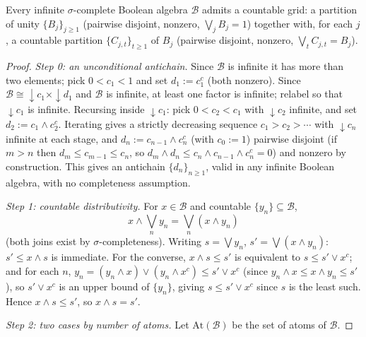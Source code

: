 \documentclass[10pt,a4paper]{amsart}
\begin{document}
\begin{theorem}\label{thm:grid-existence}
Every infinite $\sigma$-complete Boolean algebra $\mathcal B$ admits a
countable grid: a partition of unity $\{B_j\}_{j\geq1}$ (pairwise
disjoint, nonzero, $\bigvee_jB_j=1$) together with, for each $j$, a
countable partition $\{C_{j,t}\}_{t\geq1}$ of $B_j$ (pairwise disjoint,
nonzero, $\bigvee_tC_{j,t}=B_j$).
\end{theorem}

\begin{proof}
\emph{Step 0: an unconditional antichain.} Since $\mathcal B$ is infinite
it has more than two elements; pick $0<c_1<1$ and set $d_1:=c_1^c$ (both
nonzero). Since $\mathcal B\cong{\downarrow}c_1\times{\downarrow}d_1$ and
$\mathcal B$ is infinite, at least one factor is infinite; relabel so
that ${\downarrow}c_1$ is infinite. Recursing inside ${\downarrow}c_1$:
pick $0<c_2<c_1$ with ${\downarrow}c_2$ infinite, and set
$d_2:=c_1\wedge c_2^c$. Iterating gives a strictly decreasing sequence
$c_1>c_2>\cdots$ with ${\downarrow}c_n$ infinite at each stage, and
$d_n:=c_{n-1}\wedge c_n^c$ (with $c_0:=1$) pairwise disjoint (if $m>n$
then $d_m\leq c_{m-1}\leq c_n$, so
$d_m\wedge d_n\leq c_n\wedge c_{n-1}\wedge c_n^c=0$) and nonzero by
construction. This gives an antichain $\{d_n\}_{n\geq1}$, valid in any
infinite Boolean algebra, with no completeness assumption.

\emph{Step 1: countable distributivity.} For $x\in\mathcal B$ and
countable $\{y_n\}\subseteq\mathcal B$,
\[
x\wedge\bigvee_ny_n=\bigvee_n(x\wedge y_n)
\]
(both joins exist by $\sigma$-completeness). Writing $s=\bigvee y_n$,
$s'=\bigvee(x\wedge y_n)$: $s'\leq x\wedge s$ is immediate. For the
converse, $x\wedge s\leq s'$ is equivalent to $s\leq s'\vee x^c$; and for
each $n$, $y_n=(y_n\wedge x)\vee(y_n\wedge x^c)\leq s'\vee x^c$ (since
$y_n\wedge x\leq x\wedge y_n\leq s'$), so $s'\vee x^c$ is an upper bound
of $\{y_n\}$, giving $s\leq s'\vee x^c$ since $s$ is the least such.
Hence $x\wedge s\leq s'$, so $x\wedge s=s'$.

\emph{Step 2: two cases by number of atoms.} Let $\mathrm{At}(\mathcal
B)$ be the set of atoms of $\mathcal B$.


\end{proof}
\end{document}
